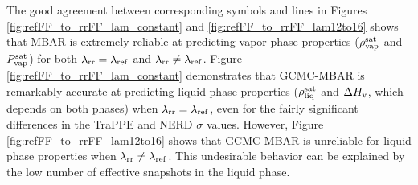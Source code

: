 \documentclass[journal=jced,manuscript=article]{achemso}
\begin{document}
The good agreement between corresponding symbols and lines in Figures \ref{fig:refFF_to_rrFF_lam_constant} and \ref{fig:refFF_to_rrFF_lam12to16} shows that MBAR is extremely reliable at predicting vapor phase properties ($\rho_{\rm vap}^{\rm sat}$ and $P_{\rm vap}^{\rm sat}$) for both $\lambda_{\rm rr} = \lambda_{\rm ref}$ and $\lambda_{\rm rr} \neq \lambda_{\rm ref}$. Figure \ref{fig:refFF_to_rrFF_lam_constant} demonstrates that GCMC-MBAR is remarkably accurate at predicting liquid phase properties ($\rho_{\rm liq}^{\rm sat}$ and $\Delta H_{\rm v}$, which depends on both phases) when $\lambda_{\rm rr} = \lambda_{\rm ref}$, even for the fairly significant differences in the TraPPE and NERD $\sigma$ values. However, Figure \ref{fig:refFF_to_rrFF_lam12to16} shows that GCMC-MBAR is unreliable for liquid phase properties when $\lambda_{\rm rr} \neq \lambda_{\rm ref}$. This undesirable behavior can be explained by the low number of effective snapshots in the liquid phase.



\end{document}
